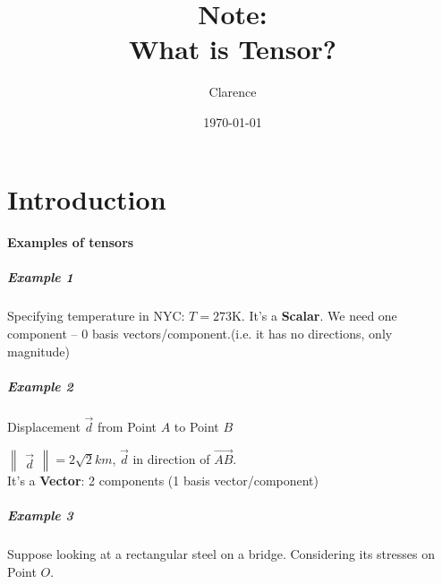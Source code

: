 \documentclass[UTF8]{ctexart}
\title{Note: \\What is Tensor?}
\date{\today}
\author{Clarence}
\theoremstyle{definition}
\theoremstyle{remark}
\begin{document}
\maketitle
\newpage

\tableofcontents
\newpage

\section{Introduction}
\label{sec:introduction}

\paragraph{Examples of tensors}
\label{par:examples_of_tensors}

\subparagraph{Example 1}
\label{subp:example_1}
Specifying temperature in NYC: \( T = 273 \mathrm{K} \). It's a \textbf{Scalar}. We need one component -- 0 basis vectors/component.(i.e. it has no directions, only magnitude)

\subparagraph{Example 2}
\label{subp:example_2}
Displacement $\vec d$ from Point $A$ to Point $B$


$ \begin{Vmatrix} \vec{d} \end{Vmatrix} = 2\sqrt{2} \si{km}  $,
$ \vec{d} $ in direction of $ \vec{AB}$. \\
It's a \textbf{Vector}: 2 components (1 basis vector/component)

\subparagraph{Example 3}
\label{subp:example_3}
Suppose looking at a rectangular steel on a bridge. Considering its stresses on Point $O$.
\end{document}
